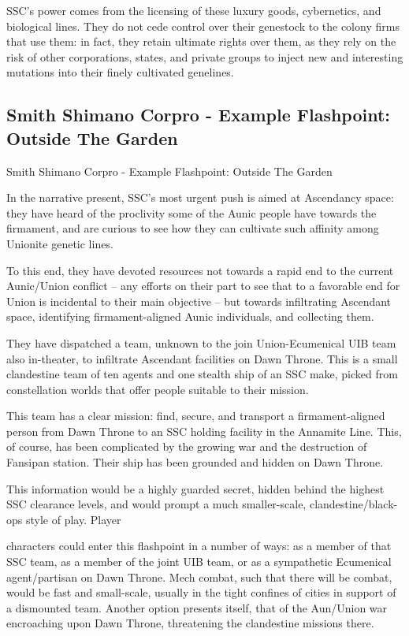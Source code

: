 SSC’s power comes from the licensing of these luxury goods, cybernetics, and biological lines.
They do not cede control over their genestock to the colony firms that use them: in fact, they
retain ultimate rights over them, as they rely on the risk of other corporations, states, and private
groups to inject new and interesting mutations into their finely cultivated genelines.

\subsection{Smith Shimano Corpro - Example Flashpoint: Outside The Garden  }
Smith Shimano Corpro - Example Flashpoint: Outside The Garden

In the narrative present, SSC’s most urgent push is aimed at Ascendancy space: they have heard
of the proclivity some of the Aunic people have towards the firmament, and are curious to see
how they can cultivate such affinity among Unionite genetic lines.


To this end, they have devoted resources not towards a rapid end to the current Aunic/Union
conflict -- any efforts on their part to see that to a favorable end for Union is incidental to their
main objective -- but towards infiltrating Ascendant space, identifying firmament-aligned Aunic
individuals, and collecting them.


They have dispatched a team, unknown to the join Union-Ecumenical UIB team also in-theater,
to infiltrate Ascendant facilities on Dawn Throne. This is a small clandestine team of ten agents
and one stealth ship of an SSC make, picked from constellation worlds that offer people suitable
to their mission.


This team has a clear mission: find, secure, and transport a firmament-aligned person from Dawn
Throne to an SSC holding facility in the Annamite Line. This, of course, has been complicated by
the growing war and the destruction of Fansipan station. Their ship has been grounded and
hidden on Dawn Throne.


This information would be a highly guarded secret, hidden behind the highest SSC clearance
levels, and would prompt a much smaller-scale, clandestine/black-ops style of play. Player




characters could enter this flashpoint in a number of ways: as a member of that SSC team, as a
member of the joint UIB team, or as a sympathetic Ecumenical agent/partisan on Dawn Throne.
Mech combat, such that there will be combat, would be fast and small-scale, usually in the tight
confines of cities in support of a dismounted team.  Another option presents itself, that of the
Aun/Union war encroaching upon Dawn Throne, threatening the clandestine missions there.




